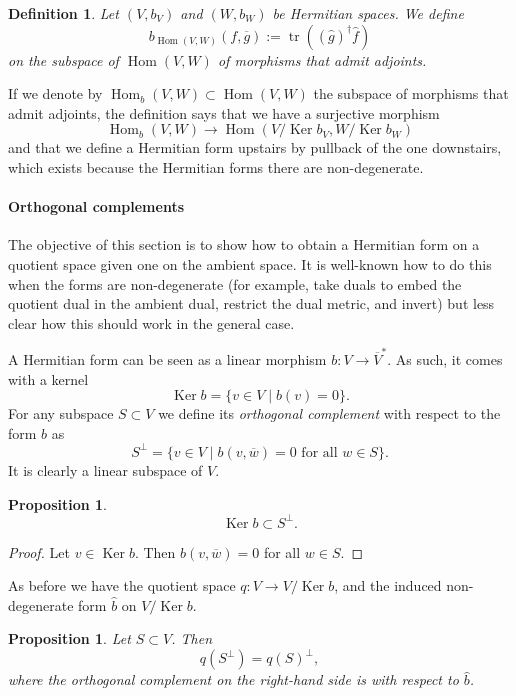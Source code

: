 \documentclass[10pt,a4paper]{article}
\newtheorem{prop}[theo]{Proposition}
\newtheorem{defi}[theo]{Definition}
\newtheorem*{proof}{Proof}
\def\ov#1{\overline{#1}}
\DeclareMathOperator{\Ker}{Ker}
\DeclareMathOperator{\Hom}{Hom}
\DeclareMathOperator{\tr}{tr}
\begin{document}
\begin{defi}
Let $(V,b_V)$ and $(W,b_W)$ be Hermitian spaces. We define
\[
b_{\Hom(V,W)}(f, \ov g) := \tr((\hat g)^\dagger \hat f)
\]
on the subspace of $\Hom(V,W)$ of morphisms that admit adjoints.
\end{defi}

If we denote by $\Hom_b(V,W) \subset \Hom(V,W)$ the subspace of morphisms that admit adjoints, the definition says that we have a surjective morphism
\[
\Hom_b(V,W) \to \Hom(V/\Ker b_V, W/\Ker b_W)
\]
and that we define a Hermitian form upstairs by pullback of the one downstairs, which exists because the Hermitian forms there are non-degenerate.






\paragraph{Orthogonal complements}


The objective of this section is to show how to obtain a Hermitian form on a quotient space given one on the ambient space. It is well-known how to do this when the forms are non-degenerate (for example, take duals to embed the quotient dual in the ambient dual, restrict the dual metric, and invert) but less clear how this should work in the general case.


A Hermitian form can be seen as a linear morphism $b : V \to \ov V^*$. As such, it comes with a kernel
\[
\Ker b = \{ v \in V \mid b(v) = 0 \}.
\]
For any subspace $S \subset V$ we define its \emph{orthogonal complement} with respect to the form $b$ as
\[
S^\perp = \{ v \in V \mid b(v, \ov w) = 0 \text{ for all $w \in S$}\}.
\]
It is clearly a linear subspace of $V$.

\begin{prop}
\[
\Ker b \subset S^\perp.
\]
\end{prop}

\begin{proof}
Let $v \in \Ker b$. Then $b(v, \ov w) = 0$ for all $w \in S$.
\end{proof}


As before we have the quotient space $q : V \to V / \Ker b$, and the induced non-degenerate form $\hat b$ on $V / \Ker b$.

\begin{prop}
Let $S \subset V$. Then
\[
q(S^\perp) = q(S)^\perp,
\]
where the orthogonal complement on the right-hand side is with respect to $\hat b$.
\end{prop}
\end{document}
